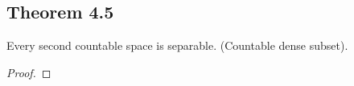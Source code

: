 \documentclass[../../main.tex]{subfiles}
\begin{document}
\subsection{Theorem 4.5}
\begin{wts}
    Every second countable space is separable. (Countable dense subset).
\end{wts}
\begin{proof}

\end{proof}
\end{document}
